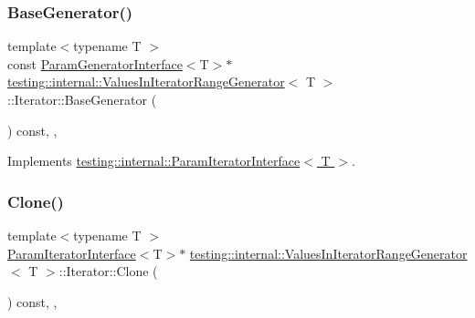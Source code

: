 \subsubsection{\texorpdfstring{Base\+Generator()}{BaseGenerator()}}
{\footnotesize\ttfamily template$<$typename T $>$ \\
const \hyperlink{classtesting_1_1internal_1_1ParamGeneratorInterface}{Param\+Generator\+Interface}$<$T$>$$\ast$ \hyperlink{classtesting_1_1internal_1_1ValuesInIteratorRangeGenerator}{testing\+::internal\+::\+Values\+In\+Iterator\+Range\+Generator}$<$ T $>$\+::Iterator\+::\+Base\+Generator (\begin{DoxyParamCaption}{ }\end{DoxyParamCaption}) const\hspace{0.3cm}{\ttfamily [inline]}, {\ttfamily [override]}, {\ttfamily [virtual]}}



Implements \hyperlink{classtesting_1_1internal_1_1ParamIteratorInterface_a17500953df75ecda1ace46c08ff731e9}{testing\+::internal\+::\+Param\+Iterator\+Interface$<$ T $>$}.

\mbox{\label{classtesting_1_1internal_1_1ValuesInIteratorRangeGenerator_1_1Iterator_a2c5ccf4da12cfb089829438d679ae35e}} 
\subsubsection{\texorpdfstring{Clone()}{Clone()}}
{\footnotesize\ttfamily template$<$typename T $>$ \\
\hyperlink{classtesting_1_1internal_1_1ParamIteratorInterface}{Param\+Iterator\+Interface}$<$T$>$$\ast$ \hyperlink{classtesting_1_1internal_1_1ValuesInIteratorRangeGenerator}{testing\+::internal\+::\+Values\+In\+Iterator\+Range\+Generator}$<$ T $>$\+::Iterator\+::\+Clone (\begin{DoxyParamCaption}{ }\end{DoxyParamCaption}) const\hspace{0.3cm}{\ttfamily [inline]}, {\ttfamily [override]}, {\ttfamily [virtual]}}




